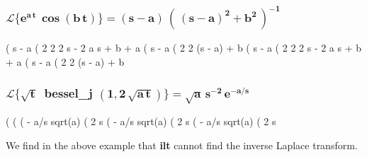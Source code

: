 \documentclass[12pt]{article}
\begin{document}
\subsubsection*{$\mathbf{\mathcal{L} \{e^{a\,t}\,\boldsymbol{\cos}(b\,t)\} = (s-a)\,(\,(s-a)^{2} + b^{2}\,)^{-1}}$}
\begin{myVerbatim}
(%
                                    s - a
(%
                              2            2    2
                             s  - 2 a s + b  + a
(%
                                     s - a
(%
                                        2    2
                                 (s - a)  + b
(%
                                    s - a
(%
                              2            2    2
                             s  - 2 a s + b  + a
(%
                                     s - a
(%
                                        2    2
                                 (s - a)  + b								 
\end{myVerbatim}
\subsubsection*{$\mathbf{\mathcal{L} \{\sqrt{t}}$ \,\textbf{bessel\_j} $\mathbf{(1,2\,\sqrt{a\,t})\} =
 \sqrt{a}\,s^{-2}\,e^{-a/s}}$ }
\begin{myVerbatim}
(%
(%
(%
                                          - a/s
                                sqrt(a) %
(%
                                       2
                                      s
(%
                                          - a/s
                                sqrt(a) %
(%
                                       2
                                      s
(%
                                        - a/s
                              sqrt(a) %
(%
                                     2
                                    s
							  
\end{myVerbatim}
We find in the above example that \textbf{ilt} cannot find the inverse Laplace transform.
\newpage
\end{document}

